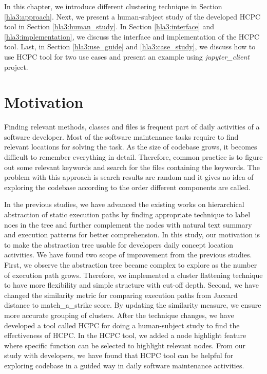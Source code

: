 In this chapter, we introduce different clustering technique in Section \ref{hla3:approach}. Next, we present a  human-subject study of the developed HCPC tool in Section \ref{hla3:human_study}. In Section \ref{hla3:interface} and \ref{hla3:implementation}, we discuss the interface and implementation of the HCPC tool. Last, in Section \ref{hla3:use_guide} and \ref{hla3:case_study}, we discuss how to use HCPC tool for two use cases and present an example using \emph{jupyter\_client} project.

\section{Motivation}
Finding relevant methods, classes and files is frequent part of daily activities of a software developer. Most of the software maintenance tasks require to find relevant locations for solving the task. As the size of codebase grows, it becomes difficult to remember everything in detail. Therefore, common practice is to figure out some relevant keywords and search for the files containing the keywords. The problem with this approach is search results are random and it gives no idea of exploring the codebase according to the order different components are called.

In the previous studies, we have advanced the existing works on hierarchical abstraction of static execution paths by finding appropriate technique to label noes in the tree and further complement the nodes with natural text summary and execution patterns for better comprehension. In this study, our motivation is to make the abstraction tree usable for developers daily concept location activities. We have found two scope of improvement from the previous studies. First, we observe the abstraction tree became complex to explore as the number of execution path grows. Therefore, we implemented a cluster flattening technique to have more flexibility and simple structure with cut-off depth. Second, we have changed the similarity metric for comparing execution paths from Jaccard distance to match\_a\_strike score. By updating the similarity measure, we ensure more accurate grouping of clusters. After the technique changes, we have developed a tool called HCPC for doing a human-subject study to find the effectiveness of HCPC. In the HCPC tool, we added a node highlight feature where specific function can be selected to highlight relevant nodes. From our study with developers, we have found that HCPC tool can be helpful for exploring codebase in a guided way in daily software maintenance activities. 



